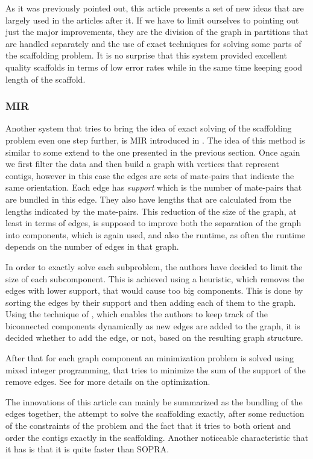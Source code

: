\documentclass[11pt]{article}
\begin{document}
As it was previously pointed out, this article presents a set of new ideas that
are largely used in the articles after it. If we have to limit ourselves to
pointing out just the major improvements, they are the division of the graph in
partitions that are handled separately and the use of exact techniques for
solving some parts of the scaffolding problem. It is no surprise that this
system provided excellent quality scaffolds in terms of low error rates while in
the same time keeping good length of the scaffold.

\subsubsection{MIR} %
\label{ssub:MIR}
Another system that tries to bring the idea of exact solving of the scaffolding
problem even one step further, is MIR introduced in \cite{MIR}. The idea of this
method is similar to some extend to the one presented in the previous section.
Once again we first filter the data and then build a graph with vertices that
represent contigs, however in this case the edges are sets of mate-pairs that
indicate the same orientation. Each edge has \emph{support} which is the number
of mate-pairs that are bundled in this edge. They also have lengths that are
calculated from the lengths indicated by the mate-pairs. This reduction of the
size of the graph, at least in terms of edges, is supposed to improve both the
separation of the graph into components, which is again used, and also the
runtime, as often the runtime depends on the number of edges in that graph.

In order to exactly solve each subproblem, the authors have decided to limit the
size of each subcomponent. This is achieved using a heuristic, which removes the
edges with lower support, that would cause too big components. This is done by
sorting the edges by their support and then adding each of them to the graph.
Using the technique of \cite{westbrook-tarjan}, which enables the authors to
keep track of the biconnected components dynamically as new edges are added to
the graph, it is decided whether to add the edge, or not, based on the resulting
graph structure.

After that for each graph component an minimization problem is solved using
mixed integer programming, that tries to minimize the sum of the support of the
remove edges. See \cite{MIR} for more details on the optimization.

The innovations of this article can mainly be summarized as the bundling of the
edges together, the attempt to solve the scaffolding exactly, after some
reduction of the constraints of the problem and the fact that it tries to both
orient and order the contigs exactly in the scaffolding. Another noticeable
characteristic that it has is that it is quite faster than SOPRA.
\end{document}

